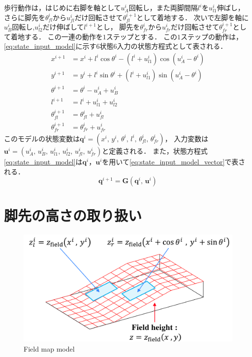 \documentclass[autodetect-engine,dvipdfmx-if-dvi,ja=standard,a4j,jbase=11pt,magstyle=nomag*]{bxjsreport}
\begin{document}
歩行動作は，はじめに右脚を軸として$u_A^i$回転し，また両脚間隔$l^i$を$u_{l1}^i$伸ばし，
さらに脚先を$\theta_{fl}^i$から$u_{fl}^i$だけ回転させて$\theta_{fl}^{i + 1}$として着地する．
次いで左脚を軸に$u_B^i$回転し,$u_{l2}^i$だけ伸ばして$l^{i + 1}$とし，
脚先を$\theta_{fr}^i$から$u_{fr}^i$だけ回転させて$\theta_{fr}^{i + 1}$として着地する．
この一連の動作を$1$ステップとする．
この$1$ステップの動作は，\cref{eq:state_input_model}に示す$6$状態$6$入力の状態方程式として表される．
\begin{equation}
    \label{eq:state_input_model}
    \begin{aligned}
        x^{i + 1} & = x^i + l^i \cos \theta^i - \left( l^i + u_{l1}^i \right) \cos \left( u_A^i - \theta^i \right) \\
        y^{i + 1} & = y^i + l^i \sin \theta^i + \left( l^i + u_{l1}^i \right) \sin \left( u_A^i - \theta^i \right) \\   
        \theta^{i + 1} & = \theta^i - u_A^i + u_B^i \\  
        l^{i + 1} & = l^i + u_{l1}^i + u_{l2}^i \\
        \theta_{fl}^{i + 1} & = \theta_{fl}^i + u_{fl}^i \\
        \theta_{fr}^{i + 1} & = \theta_{fr}^i + u_{fr}^i
    \end{aligned}
\end{equation}
このモデルの状態変数は$\bm{q}^i = ( x^i ,\, y^i ,\, \theta^i ,\, l^i ,\, \theta_{fl}^i ,\, \theta_{fr}^i )$，
入力変数は$\bm{u}^i = ( u_A^i ,\, u_B^i ,\, u_{l1}^i ,\, u_{l2}^i ,\, u_{fl}^i ,\, u_{fr}^i )$と定義される．
また，状態方程式\cref{eq:state_input_model}は$\bm{q}^i$，$\bm{u}^i$を用いて\cref{eq:state_input_model_vector}で表される．
\begin{equation} \label{eq:state_input_model_vector}
    \bm{q}^{i + 1} = \bm{G} \left( \bm{q}^i ,\, \bm{u}^i \right)
\end{equation}


\section{脚先の高さの取り扱い}

\begin{figure}[t]
    \centering
    \includegraphics[width=0.8\linewidth, clip]{./figure/const_z_field_wide.pdf}
    \caption{Field map model}
    \label{fig:const_z_field}
\end{figure}
\end{document}
